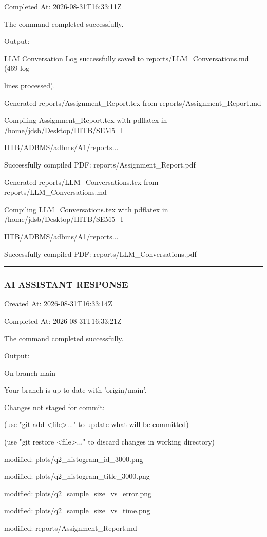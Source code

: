 \documentclass[11pt,a4paper]{article}
\begin{document}
Completed At: 2026-08-31T16:33:11Z


The command completed successfully.

Output:

LLM Conversation Log successfully saved to reports/LLM\_Conversations.md (469 log

lines processed).

Generated reports/Assignment\_Report.tex from reports/Assignment\_Report.md

Compiling Assignment\_Report.tex with pdflatex in /home/jdsb/Desktop/IIITB/SEM5\_I

IITB/ADBMS/adbms/A1/reports...

Successfully compiled PDF: reports/Assignment\_Report.pdf

Generated reports/LLM\_Conversations.tex from reports/LLM\_Conversations.md

Compiling LLM\_Conversations.tex with pdflatex in /home/jdsb/Desktop/IIITB/SEM5\_I

IITB/ADBMS/adbms/A1/reports...

Successfully compiled PDF: reports/LLM\_Conversations.pdf


\hrule

\subsubsection{AI ASSISTANT RESPONSE}

Created At: 2026-08-31T16:33:14Z

Completed At: 2026-08-31T16:33:21Z


The command completed successfully.

Output:

On branch main

Your branch is up to date with 'origin/main'.


Changes not staged for commit:

(use "git add <file>..." to update what will be committed)

(use "git restore <file>..." to discard changes in working directory)

modified:   plots/q2\_histogram\_id\_3000.png

modified:   plots/q2\_histogram\_title\_3000.png

modified:   plots/q2\_sample\_size\_vs\_error.png

modified:   plots/q2\_sample\_size\_vs\_time.png

modified:   reports/Assignment\_Report.md
\end{document}
